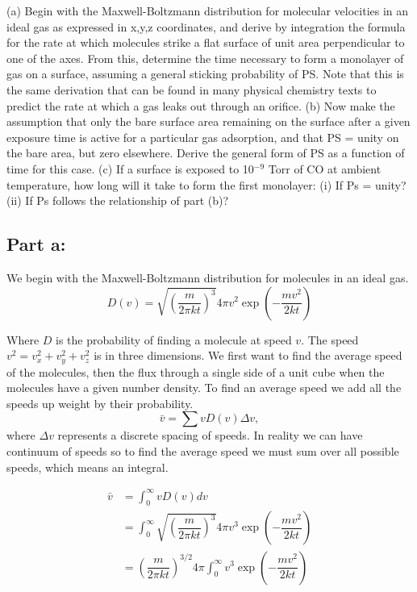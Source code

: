 \documentclass[12pt]{article}
\renewcommand{\=}[1]{\stackrel{#1}{=}} %
\theoremstyle{definition}
\theoremstyle{remark}
\begin{document}
\begin{bclogo}[logo=\bcquestion , barre=none]
\newline
(a) Begin with the Maxwell-Boltzmann distribution for molecular velocities in an ideal gas as
expressed in x,y,z coordinates, and derive by integration the formula for the rate at which molecules
strike a flat surface of unit area perpendicular to one of the axes. From this, determine the time
necessary to form a monolayer of gas on a surface, assuming a general sticking probability of PS. Note
that this is the same derivation that can be found in many physical chemistry texts to predict the rate at
which a gas leaks out through an orifice.
\newline
(b) Now make the assumption that only the bare surface area remaining on the surface after a given
exposure time is active for a particular gas adsorption, and that PS = unity on the bare area, but zero
elsewhere. Derive the general form of PS as a function of time for this case.\newline
(c) If a surface is exposed to 10$^{-9}$ Torr of CO at ambient temperature, how long will it take to form the first monolayer:
\newline 
(i) If Ps = unity?
\newline 
(ii) If Ps follows the relationship of part (b)?
\end{bclogo}
\vspace{2cm}

\subsection*{Part a:}
We begin with the Maxwell-Boltzmann distribution for molecules in an ideal gas.
\[
D(v) = \sqrt{\left(\dfrac{m}{2\pi kt}\right)^3}4\pi v^2 \exp{\left(-\dfrac{mv^2}{2kt}\right)}
\]

Where $D$ is the probability of finding a molecule at speed $v$. The speed $v^2 = v_x^2 + v_y^2 + v_z^2$ is in three dimensions. We first want to find the average speed of the molecules, then the flux through a single side of a unit cube when the molecules have a given number density. To find an average speed we add all the speeds up weight by their probability.
\[
	\bar{v}  = \sum v D(v) \Delta v,
\]
where $\Delta v$ represents a discrete spacing of speeds. In reality we can have continuum of speeds so to find the average speed we must sum over all possible speeds, which means an integral.

\begin{align*}
	\bar{v} &= \int_{0}^{\infty} v D(v) dv \\[3mm]
		&= \int_{0}^{\infty} \sqrt{\left(\dfrac{m}{2\pi kt}\right)^3}4\pi v^3 \exp{\left(-\dfrac{mv^2}{2kt}\right)} \\[3mm]
		&= \left(\dfrac{m}{2\pi kt}\right)^{3/2} 4\pi \int_{0}^{\infty} v^3 \exp{\left(-\dfrac{mv^2}{2kt}\right)}
\end{align*}
	
\end{document}
